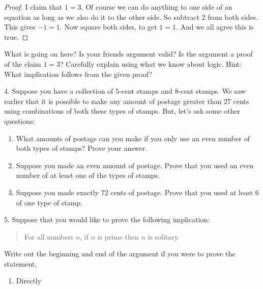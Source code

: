 \documentclass[10pt,]{book}
\theoremstyle{plain}
\theoremstyle{definition}
\numberwithin{equation}{chapter}
\begin{document}
\begin{exerciselist}
\begin{proof}
            I claim that \(1 = 3\). Of course we can do anything to one side of an equation as long as we also do it to the other side. So subtract 2 from both sides. This gives \(-1 = 1\). Now square both sides, to get \(1 = 1\). And we all agree this is true.
\end{proof}
\par

          What is going on here? Is your friends argument valid? Is the argument a proof of the claim \(1=3\)? Carefully explain using what we know about logic. Hint: What implication follows from the given proof?
\par\smallskip
\item[4.]\hypertarget{exercise-245}{}
        Suppose you have a collection of 5-cent stamps and 8-cent stamps. We saw earlier that it is possible to make any amount of postage greater than 27 cents using combinations of both these types of stamps. But, let's ask some other questions:
        \leavevmode%
\begin{enumerate}[label=(\alph*)]
\item\hypertarget{li-682}{}
        What amounts of postage can you make if you only use an even number of both types of stamps? Prove your answer.
\item\hypertarget{li-683}{}
        Suppose you made an even amount of postage. Prove that you used an even number of at least one of the types of stamps.
\item\hypertarget{li-684}{}
        Suppose you made exactly 72 cents of postage. Prove that you used at least 6 of one type of stamp.
\end{enumerate}
%
\par\smallskip
\item[5.]\hypertarget{exercise-246}{}
          Suppose that you would like to prove the following implication:
\par

          \begin{quote}
            For all numbers \(n\), if \(n\) is prime then \(n\) is solitary.
          \end{quote}

\par

          Write out the beginning and end of the argument if you were to prove the statement,
\leavevmode%
\begin{enumerate}[label=(\alph*)]
\item\hypertarget{li-685}{}
              Directly



\end{enumerate}
\end{exerciselist}
\end{document}
